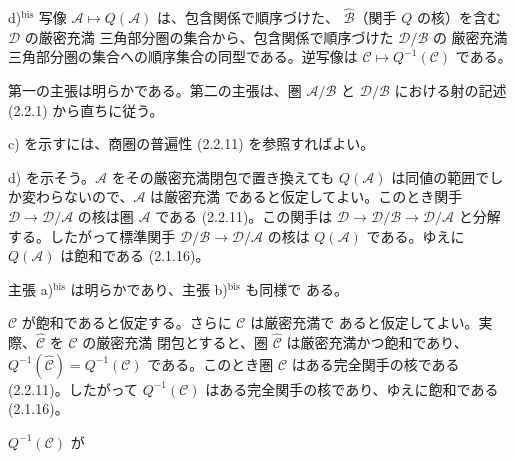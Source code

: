 \par\noindent d)$^{\mathrm{bis}}$ 写像
$\mathcal A\longmapsto Q(\mathcal A)$ は、包含関係で順序づけた、
$\widehat{\mathcal B}$（関手 $Q$ の核）を含む $\mathcal D$ の厳密充満
三角部分圏の集合から、包含関係で順序づけた $\mathcal D/\mathcal B$ の
厳密充満三角部分圏の集合への順序集合の同型である。逆写像は
$\mathcal C\longmapsto Q^{-1}(\mathcal C)$ である。
\endgroup

第一の主張は明らかである。第二の主張は、圏 $\mathcal A/\mathcal B$ と
$\mathcal D/\mathcal B$ における射の記述 (2.2.1) から直ちに従う。

c) を示すには、商圏の普遍性 (2.2.11) を参照すればよい。

d) を示そう。$\mathcal A$ をその厳密充満閉包で置き換えても
$Q(\mathcal A)$ は同値の範囲でしか変わらないので、$\mathcal A$ は厳密充満
であると仮定してよい。このとき関手
$\mathcal D\longrightarrow\mathcal D/\mathcal A$ の核は圏 $\mathcal A$
である (2.2.11)。この関手は
$\mathcal D\longrightarrow\mathcal D/\mathcal B
\longrightarrow\mathcal D/\mathcal A$ と分解する。したがって標準関手
$\mathcal D/\mathcal B\longrightarrow\mathcal D/\mathcal A$ の核は
$Q(\mathcal A)$ である。ゆえに $Q(\mathcal A)$ は飽和である (2.1.16)。

主張 a)$^{\mathrm{bis}}$ は明らかであり、主張 b)$^{\mathrm{bis}}$ も同様で
ある。

$\mathcal C$ が飽和であると仮定する。さらに $\mathcal C$ は厳密充満で
あると仮定してよい。実際、$\widehat{\mathcal C}$ を $\mathcal C$ の厳密充満
閉包とすると、圏 $\widehat{\mathcal C}$ は厳密充満かつ飽和であり、
$Q^{-1}(\widehat{\mathcal C})=Q^{-1}(\mathcal C)$ である。このとき圏
$\mathcal C$ はある完全関手の核である (2.2.11)。したがって
$Q^{-1}(\mathcal C)$ はある完全関手の核であり、ゆえに飽和である
(2.1.16)。

$Q^{-1}(\mathcal C)$ が
\endgroup
